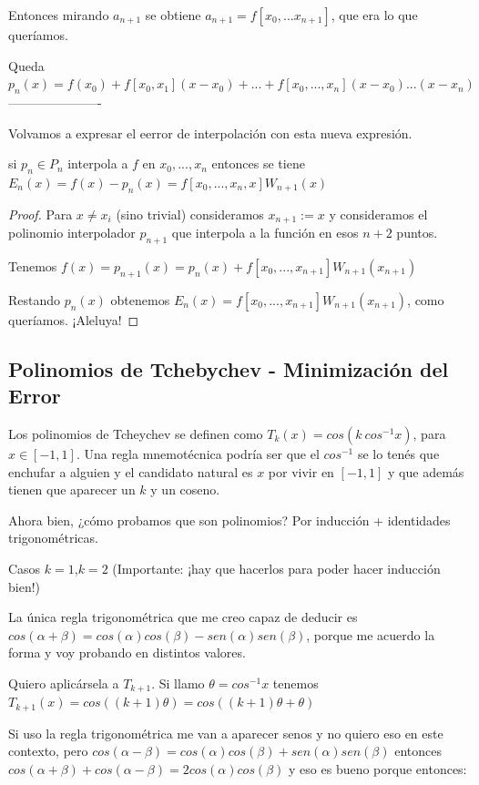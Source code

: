 \documentclass[10pt,a4paper,final]{report}
\begin{document}
Entonces mirando $a_{n+1}$ se obtiene $a_{n+1}= f[x_0,...x_{n+1}]$, que era lo que queríamos.

Queda $p_n(x) = f(x_0) + f[x_0,x_1] (x-x_0) + ... + f[x_0,...,x_n] (x-x_0)...(x-x_n)$
----------------------

Volvamos a expresar el eerror de interpolación con esta nueva expresión.

\begin{theorem}si $p_n \in P_n$ interpola a $f$ en $x_0,...,x_n$ entonces se tiene $E_n(x) = f(x) - p_n(x) = f[x_0,...,x_n,x] W_{n+1}(x)$
\end{theorem}

\begin{proof} Para $x \neq x_i$ (sino trivial) consideramos $x_{n+1}:=x$ y consideramos el polinomio interpolador $p_{n+1}$ que interpola a la función en esos $n+2$ puntos.

Tenemos $f(x) = p_{n+1}(x) = p_n(x) + f[x_0,...,x_{n+1}]W_{n+1}(x_{n+1})$

Restando $p_n(x)$ obtenemos $E_n(x) = f[x_0,...,x_{n+1}]W_{n+1}(x_{n+1})$, como queríamos. ¡Aleluya!

\end{proof}

\subsection{Polinomios de Tchebychev - Minimización del Error}

Los polinomios de Tcheychev se definen como $T_k(x) = cos(k\ cos^{-1}x)$, para $x\in[-1,1]$. Una regla mnemotécnica podría ser que el $cos^{-1}$ se lo tenés que enchufar a alguien y el candidato natural es $x$ por vivir en $[-1,1]$ y que además tienen que aparecer un $k$ y un coseno.

Ahora bien, ¿cómo probamos que son polinomios? Por inducción + identidades trigonométricas.

Casos $k=1$,$k=2$ (Importante: ¡hay que hacerlos para poder hacer inducción bien!)

La única regla trigonométrica que me creo capaz de deducir es $cos(\alpha + \beta) = cos(\alpha) cos(\beta) - sen(\alpha) sen(\beta)$, porque me acuerdo la forma y voy probando en distintos valores.

Quiero aplicársela a $T_{k+1}$. Si llamo $\theta = cos^{-1}x$ tenemos $T_{k+1}(x) = cos((k+1)\theta) = cos((k+1)\theta + \theta)$

Si uso la regla trigonométrica me van a aparecer senos y no quiero eso en este contexto, pero $cos(\alpha - \beta) = cos(\alpha) cos(\beta) + sen(\alpha) sen(\beta)$ entonces $cos(\alpha + \beta) + cos(\alpha - \beta) = 2 cos(\alpha) cos(\beta)$ y eso es bueno porque entonces:\\
\end{document}
